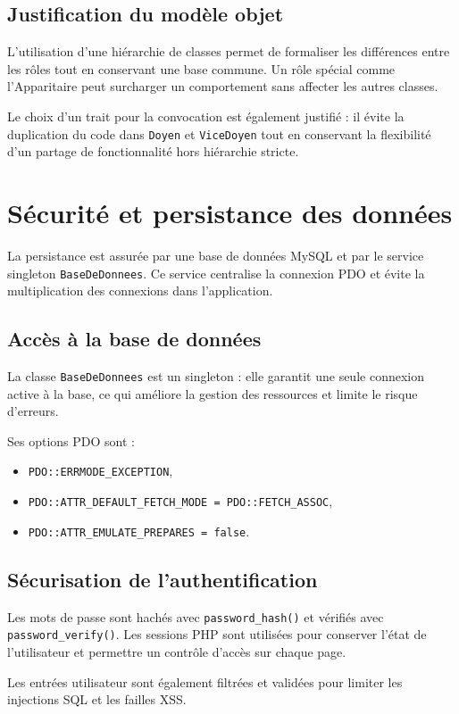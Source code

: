 \documentclass[12pt,a4paper]{article}
\begin{document}
\subsection{Justification du modèle objet}
L'utilisation d'une hiérarchie de classes permet de formaliser les différences entre les rôles tout en conservant une base commune. Un rôle spécial comme l'Apparitaire peut surcharger un comportement sans affecter les autres classes.

Le choix d'un trait pour la convocation est également justifié : il évite la duplication du code dans \texttt{Doyen} et \texttt{ViceDoyen} tout en conservant la flexibilité d'un partage de fonctionnalité hors hiérarchie stricte.

\section{Sécurité et persistance des données}
La persistance est assurée par une base de données MySQL et par le service singleton \texttt{BaseDeDonnees}. Ce service centralise la connexion PDO et évite la multiplication des connexions dans l'application.

\subsection{Accès à la base de données}
La classe \texttt{BaseDeDonnees} est un singleton : elle garantit une seule connexion active à la base, ce qui améliore la gestion des ressources et limite le risque d'erreurs.

Ses options PDO sont :
\begin{itemize}
  \item \texttt{PDO::ERRMODE_EXCEPTION},
  \item \texttt{PDO::ATTR_DEFAULT_FETCH_MODE = PDO::FETCH_ASSOC},
  \item \texttt{PDO::ATTR_EMULATE_PREPARES = false}.
\end{itemize}

\subsection{Sécurisation de l'authentification}
Les mots de passe sont hachés avec \texttt{password\_hash()} et vérifiés avec \texttt{password\_verify()}. Les sessions PHP sont utilisées pour conserver l'état de l'utilisateur et permettre un contrôle d'accès sur chaque page.

Les entrées utilisateur sont également filtrées et validées pour limiter les injections SQL et les failles XSS.
\end{document}
